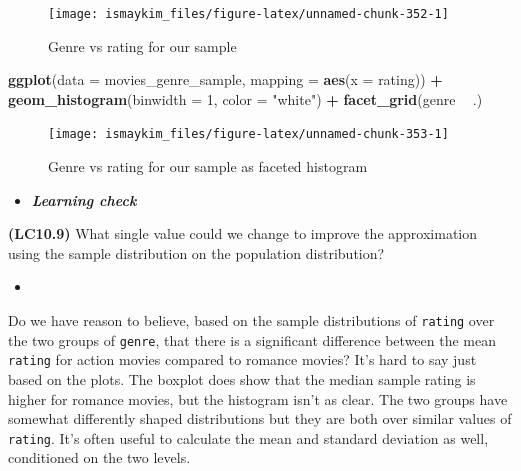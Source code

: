 \documentclass[12pt, krantz2,]{krantz}
\makeatletter
\newenvironment{Shaded}{\begin{snugshade}}{\end{snugshade}}
\newcommand{\DataTypeTok}[1]{\textcolor[rgb]{0.27,0.27,0.27}{#1}}
\newcommand{\DecValTok}[1]{\textcolor[rgb]{0.06,0.06,0.06}{#1}}
\newcommand{\KeywordTok}[1]{\textcolor[rgb]{0.27,0.27,0.27}{\textbf{#1}}}
\newcommand{\NormalTok}[1]{#1}
\newcommand{\OperatorTok}[1]{\textcolor[rgb]{0.43,0.43,0.43}{\textbf{#1}}}
\newcommand{\StringTok}[1]{\textcolor[rgb]{0.5,0.5,0.5}{#1}}
\newenvironment{kframe}{%
\medskip{}
\setlength{\fboxsep}{.8em}
 \def\at@end@of@kframe{}%
 \ifinner\ifhmode%
  \def\at@end@of@kframe{\end{minipage}}%
  \begin{minipage}{\columnwidth}%
 \fi\fi%
 \def\FrameCommand##1{\hskip\@totalleftmargin \hskip-\fboxsep
 \colorbox{shadecolor}{##1}\hskip-\fboxsep
     \hskip-\linewidth \hskip-\@totalleftmargin \hskip\columnwidth}%
 \MakeFramed {\advance\hsize-\width
   \@totalleftmargin\z@ \linewidth\hsize
   \@setminipage}}%
 {\par\unskip\endMakeFramed%
 \at@end@of@kframe}
\renewenvironment{Shaded}{\begin{kframe}}{\end{kframe}}
\newenvironment{rmdblock}[1]
  {\begin{shaded*}
  \begin{itemize}
  \renewcommand{\labelitemi}{
    \raisebox{-.7\height}[0pt][0pt]{
    }
  }
  \item
  }
  {
  \end{itemize}
  \end{shaded*}
  }
\newenvironment{learncheck}
  {\begin{rmdblock}{warning}}
  {\end{rmdblock}}
\makeatother
\begin{document}
\begin{figure}

{\centering \texttt{[image: ismaykim\_files/figure-latex/unnamed-chunk-352-1]} 

}

\caption{Genre vs rating for our sample}\label{fig:unnamed-chunk-352}
\end{figure}

\begin{Shaded}
\begin{Highlighting}[]
\KeywordTok{ggplot}\NormalTok{(}\DataTypeTok{data =}\NormalTok{ movies_genre_sample, }\DataTypeTok{mapping =} \KeywordTok{aes}\NormalTok{(}\DataTypeTok{x =}\NormalTok{ rating)) }\OperatorTok{+}
\StringTok{  }\KeywordTok{geom_histogram}\NormalTok{(}\DataTypeTok{binwidth =} \DecValTok{1}\NormalTok{, }\DataTypeTok{color =} \StringTok{"white"}\NormalTok{) }\OperatorTok{+}
\StringTok{  }\KeywordTok{facet_grid}\NormalTok{(genre }\OperatorTok{~}\StringTok{ }\NormalTok{.)}
\end{Highlighting}
\end{Shaded}

\begin{figure}

{\centering \texttt{[image: ismaykim\_files/figure-latex/unnamed-chunk-353-1]} 

}

\caption{Genre vs rating for our sample as faceted histogram}\label{fig:unnamed-chunk-353}
\end{figure}

\begin{learncheck}
\textbf{\emph{Learning check}}
\end{learncheck}

\textbf{(LC10.9)} What single value could we change to improve the approximation using the sample distribution on the population distribution?

\begin{learncheck}

\end{learncheck}

Do we have reason to believe, based on the sample distributions of \texttt{rating} over the two groups of \texttt{genre}, that there is a significant difference between the mean \texttt{rating} for action movies compared to romance movies? It's hard to say just based on the plots. The boxplot does show that the median sample rating is higher for romance movies, but the histogram isn't as clear. The two groups have somewhat differently shaped distributions but they are both over similar values of \texttt{rating}. It's often useful to calculate the mean and standard deviation as well, conditioned on the two levels.
\end{document}
